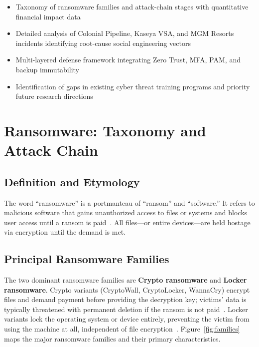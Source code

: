 \documentclass[sigconf,nonacm]{acmart}
\begin{document}
\begin{itemize}
  \item Taxonomy of ransomware families and attack-chain stages with quantitative
        financial impact data
  \item Detailed analysis of Colonial Pipeline, Kaseya VSA, and MGM Resorts incidents
        identifying root-cause social engineering vectors
  \item Multi-layered defense framework integrating Zero Trust, MFA, PAM, and backup
        immutability
  \item Identification of gaps in existing cyber threat training programs and priority
        future research directions
\end{itemize}

\section{Ransomware: Taxonomy and Attack Chain}

\subsection{Definition and Etymology}

The word ``ransomware'' is a portmanteau of ``ransom'' and ``software.'' It refers to
malicious software that gains unauthorized access to files or systems and blocks user
access until a ransom is paid~\cite{groot2023,shea2023}. All files---or entire
devices---are held hostage via encryption until the demand is met.

\subsection{Principal Ransomware Families}

The two dominant ransomware families are \textbf{Crypto ransomware} and \textbf{Locker
ransomware}. Crypto variants (CryptoWall, CryptoLocker, WannaCry) encrypt files and
demand payment before providing the decryption key; victims' data is typically
threatened with permanent deletion if the ransom is not paid~\cite{ekta2021}.
Locker variants lock the operating system or device entirely, preventing the victim
from using the machine at all, independent of file encryption~\cite{savage2015}.
Figure~\ref{fig:families} maps the major ransomware families and their primary
characteristics.
\end{document}
